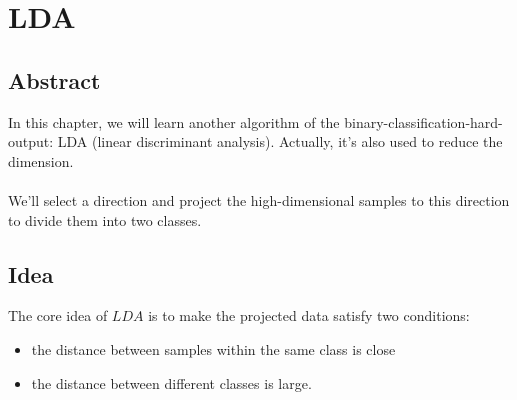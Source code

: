 \documentclass{report}
\begin{document}
\chapter{LDA}
\section{Abstract}
In this chapter, we will learn another algorithm of the binary-classification-hard-output: LDA (linear discriminant analysis). Actually, it's also used to reduce the dimension.\\\\
We'll select a direction and project the high-dimensional samples to this direction to divide them into two classes.
\section{Idea}
The core idea of $LDA$ is to make the projected data satisfy two conditions:
\begin{itemize}
	\item the distance between samples within the same class is close
	\item the distance between different classes is large.
\end{itemize}
\end{document}
